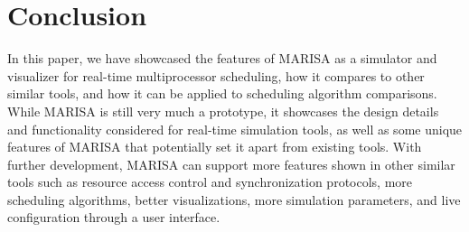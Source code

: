 \documentclass[conference,compsoc]{IEEEtran}
\begin{document}
%






\section{Conclusion}
In this paper, we have showcased the features of MARISA as a simulator and visualizer for real-time multiprocessor scheduling, how it compares to other similar tools, and how it can be applied to scheduling algorithm comparisons. While MARISA is still very much a prototype, it showcases the design details and functionality considered for real-time simulation tools, as well as some unique features of MARISA that potentially set it apart from existing tools. With further development, MARISA can support more features shown in other similar tools such as resource access control and synchronization protocols, more scheduling algorithms, better visualizations, more simulation parameters, and live configuration through a user interface.
\end{document}
